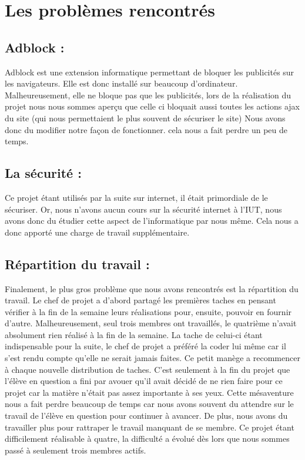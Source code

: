 \documentclass[11pt,a4paper,titlepage]{report}
\begin{document}
\chapter{Les problèmes rencontrés}

\section{Adblock :} 
Adblock est une extension informatique permettant de bloquer les publicités sur les navigateurs. Elle est donc installé sur beaucoup d'ordinateur. 
Malheureusement, elle ne bloque pas que les publicités, lors de la réalisation du projet nous nous sommes aperçu que celle ci bloquait aussi toutes les actions ajax du site (qui nous permettaient le plus souvent de sécuriser le site) 
Nous avons donc du modifier notre façon de fonctionner. cela nous a fait perdre un peu de temps.

\section{La sécurité : }
Ce projet étant utilisés par la suite sur internet, il était primordiale de le sécuriser. Or, nous n'avons aucun cours sur la sécurité internet à l'IUT, nous avons donc du étudier cette aspect de l'informatique par nous même. Cela nous a donc apporté une charge de travail supplémentaire.

\section{Répartition du travail : }
Finalement, le plus gros problème que nous avons rencontrés est la répartition du travail. 
Le chef de projet a d'abord partagé les premières taches en pensant vérifier à la fin de la semaine leurs réalisations pour, ensuite, pouvoir en fournir d'autre. Malheureusement, seul trois membres ont travaillés, le quatrième n'avait absolument rien réalisé à la fin de la semaine. 
La tache de celui-ci étant indispensable pour la suite, le chef de projet a préféré la coder lui même car il s'est rendu compte qu'elle ne serait jamais faites.
Ce petit manège a recommencer à chaque nouvelle distribution de taches. C'est seulement à la fin du projet que l'élève en question a fini par avouer qu'il avait décidé de ne rien faire pour ce projet car la matière n'était pas assez importante à ses yeux. Cette mésaventure nous a fait perdre beaucoup de temps car nous avons souvent du attendre sur le travail de l'élève en question pour continuer à avancer. De plus, nous avons du travailler plus pour rattraper le travail manquant de se membre.
Ce projet étant difficilement réalisable à quatre, la difficulté a évolué dès lors que nous sommes passé à seulement trois membres actifs. 
\end{document}

